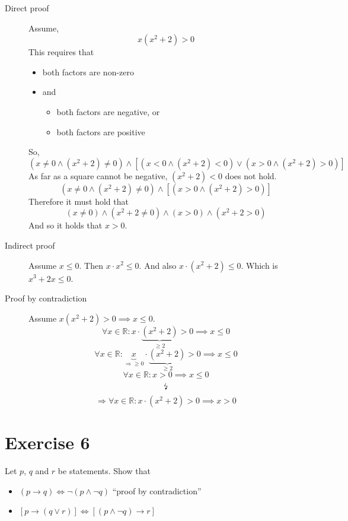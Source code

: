 \documentclass[a4paper]{article}
\theoremstyle{definition}
\begin{document}
\begin{description}
  \item[Direct proof]
    Assume,
    \[ x(x^2 + 2) > 0 \]
    This requires that
    \begin{itemize}
      \item both factors are non-zero
      \item and
        \begin{itemize}
          \item both factors are negative, or
          \item both factors are positive
        \end{itemize}
    \end{itemize}
    So,
    \[ (x \neq 0 \land (x^2 + 2) \neq 0) \land \left[(x < 0 \land (x^2 + 2) < 0) \lor (x > 0 \land (x^2 + 2) > 0)\right] \]
    As far as a square cannot be negative, $(x^2 + 2) < 0$ does not hold.
    \[ (x \neq 0 \land (x^2 + 2) \neq 0) \land \left[(x > 0 \land (x^2 + 2) > 0)\right] \]
    Therefore it must hold that
    \[ (x \neq 0) \land (x^2 + 2 \neq 0) \land (x > 0) \land (x^2 + 2 > 0) \]
    And so it holds that $x > 0$.
  \item[Indirect proof]
    Assume $x \leq 0$.
    Then $x \cdot x^2 \leq 0$.
    And also $x \cdot (x^2 + 2) \leq 0$.
    Which is $x^3 + 2x \leq 0$.
  \item[Proof by contradiction]
    Assume $x (x^2 + 2) > 0 \implies x \leq 0$.
    \[ \forall x \in \mathbb R: x \cdot \underbrace{(x^2 + 2)}_{\geq 2} > 0 \implies x \leq 0 \]
    \[ \forall x \in \mathbb R: \underbrace{x}_{\Rightarrow \geq 0} \cdot \underbrace{(x^2 + 2)}_{\geq 2} > 0 \implies x \leq 0 \]
    \[ \forall x \in \mathbb R: x > 0 \implies x \leq 0 \]
    \[ \text{\lightning} \]
    \[ \Rightarrow \forall x \in \mathbb R: x \cdot (x^2 + 2) > 0 \implies x > 0 \]
\end{description}

\section{Exercise 6}

\begin{ex}
  Let $p$, $q$ and $r$ be statements. Show that
  \begin{itemize}
    \item $(p \rightarrow q) \iff \neg (p \land \neg q)$  \hspace{30pt} \enquote{proof by contradiction}
    \item $\left[p \rightarrow (q \lor r)\right] \iff \left[(p \land \neg q) \rightarrow r\right]$
  \end{itemize}
\end{ex}
\end{document}
